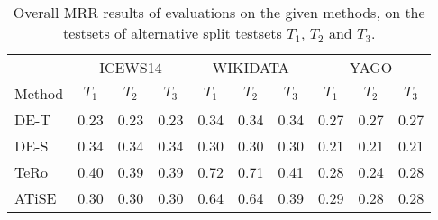 \begin{table}[htb]
\centering
\begin{minipage}{\columnwidthcaption}
\centering
\caption{Overall MRR results of evaluations on the given methods, on the testsets of alternative split testsets $T_1$, $T_2$ and $T_3$.}
\end{minipage}
\vspace{-3mm}

\begin{tabular}{l|ccc|ccc|ccc}
\hline
 & \multicolumn{3}{c|}{ICEWS14} & \multicolumn{3}{c|}{WIKIDATA} & \multicolumn{3}{c}{YAGO}\\
Method & $T_1$ & $T_2$ & $T_3$ & $T_1$ & $T_2$ & $T_3$ & $T_1$ & $T_2$ & $T_3$ \\
\hline
DE-T     & 0.23 & 0.23 & 0.23 & 0.34 & 0.34 & 0.34 & 0.27 & 0.27 & 0.27 \\
DE-S     & 0.34 & 0.34 & 0.34 & 0.30 & 0.30 & 0.30 & 0.21 & 0.21 & 0.21 \\
TeRo     & 0.40 & 0.39 & 0.39 & 0.72 & 0.71 & 0.41 & 0.28 & 0.24 & 0.28 \\
ATiSE    & 0.30 & 0.30 & 0.30 & 0.64 & 0.64 & 0.39 & 0.29 & 0.28 & 0.28 \\
\hline

\end{tabular}
\label{tab:split_results}
\end{table}
